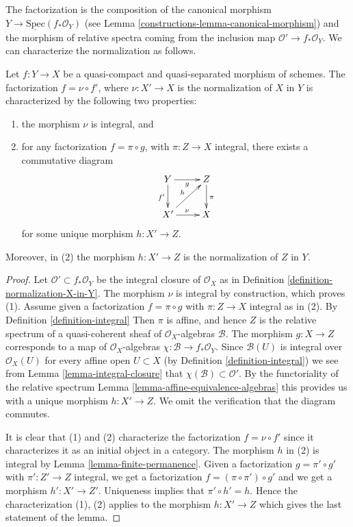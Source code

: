 \noindent
The factorization is the composition of the canonical morphism
$Y \to \underline{\text{Spec}}(f_*\mathcal{O}_Y)$ (see
Lemma \ref{constructions-lemma-canonical-morphism})
and the morphism of relative spectra coming from the inclusion map
$\mathcal{O}' \to f_*\mathcal{O}_Y$. We can characterize the
normalization as follows.

\begin{lemma}
\label{lemma-characterize-normalization}
Let $f : Y \to X$ be a quasi-compact and quasi-separated morphism of schemes.
The factorization $f = \nu \circ f'$, where $\nu : X' \to X$ is the
normalization of $X$ in $Y$ is characterized by the following
two properties:
\begin{enumerate}
\item the morphism $\nu$ is integral, and
\item for any factorization $f = \pi \circ g$, with $\pi : Z \to X$
integral, there exists a commutative diagram
$$
\xymatrix{
Y \ar[d]_{f'} \ar[r]_g & Z \ar[d]^\pi \\
X' \ar[ru]^h \ar[r]^\nu & X
}
$$
for some unique morphism $h : X' \to Z$.
\end{enumerate}
Moreover, in (2) the morphism $h : X' \to Z$ is the normalization of
$Z$ in $Y$.
\end{lemma}

\begin{proof}
Let $\mathcal{O}' \subset f_*\mathcal{O}_Y$ be the integral closure of
$\mathcal{O}_X$ as in Definition \ref{definition-normalization-X-in-Y}.
The morphism $\nu$ is integral by construction, which proves (1).
Assume given a factorization $f = \pi \circ g$ with $\pi : Z \to X$
integral as in (2). By Definition \ref{definition-integral}
Then $\pi$ is affine, and hence $Z$ is the relative
spectrum of a quasi-coherent sheaf of $\mathcal{O}_X$-algebras $\mathcal{B}$.
The morphism $g : X \to Z$ corresponds to a map of $\mathcal{O}_X$-algebras
$\chi : \mathcal{B} \to f_*\mathcal{O}_Y$. Since $\mathcal{B}(U)$ is
integral over $\mathcal{O}_X(U)$ for every affine open $U \subset X$
(by Definition \ref{definition-integral})
we see from Lemma \ref{lemma-integral-closure}
that $\chi(\mathcal{B}) \subset \mathcal{O}'$.
By the functoriality of the relative spectrum
Lemma \ref{lemma-affine-equivalence-algebras}
this provides us with a unique morphism
$h : X' \to Z$. We omit the verification that the diagram commutes.

\medskip\noindent
It is clear that (1) and (2) characterize the
factorization $f = \nu \circ f'$ since it characterizes it
as an initial object in a category. The morphism $h$ in (2)
is integral by Lemma \ref{lemma-finite-permanence}.
Given a factorization $g = \pi' \circ g'$ with $\pi' : Z' \to Z$
integral, we get a factorization $f = (\pi \circ \pi') \circ g'$ and
we get a morphism $h' : X' \to Z'$. Uniqueness implies that
$\pi' \circ h' = h$. Hence the characterization (1), (2) applies
to the morphism $h : X' \to Z$ which gives the last statement of the lemma.
\end{proof}


